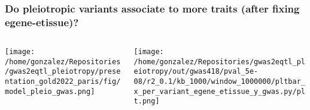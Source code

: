 \documentclass{beamer}
\begin{document}
\begin{frame}
\frametitle{}

\end{frame}

\begin{frame}
\frametitle{Do pleiotropic variants associate to more traits (after fixing egene-etissue)?}

\begin{columns}
\begin{column}{0.5\textwidth}
    \begin{center}
\texttt{[image: /home/gonzalez/Repositories/gwas2eqtl\_pleiotropy/presentation\_gold2022\_paris/fig/model\_pleio\_gwas.png]}
     \end{center}
\end{column}
\begin{column}{0.5\textwidth}  %
    \begin{center}
\texttt{[image: /home/gonzalez/Repositories/gwas2eqtl\_pleiotropy/out/gwas418/pval\_5e-08/r2\_0.1/kb\_1000/window\_1000000/pltbar\_x\_per\_variant\_egene\_etissue\_y\_gwas.py/plt.png]}
     \end{center}
\end{column}
\end{columns}

\end{frame}
\end{document}
